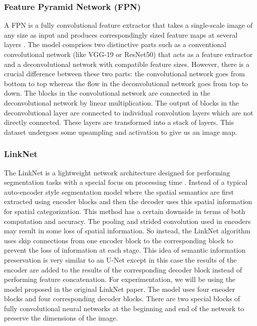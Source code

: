 \documentclass[a4paper,12pt]{spieman}  %
\begin{document}
\begin{spacing}{1}
\subsubsection{Feature Pyramid Network (FPN)}
A FPN is a fully convolutional feature extractor that takes a single-scale image of any size as input and produces correspondingly sized feature maps at several layers \cite{lin2017feature}. The model comprises two distinctive parts  such as  a conventional convolutional network (like VGG-19 or ResNet50) that acts as a feature extractor and a deconvolutional network with compatible feature sizes. However, there is a crucial difference between these two parts: the convolutional network goes from bottom to top whereas the flow in the deconvolutional network goes from top to down. The blocks in the convolutional network are connected in the deconvolutional network by linear multiplication. The output of blocks in the deconvolutional layer are connected to individual convolution layers which are not directly connected. These layers are transformed into a stack of layers. This dataset undergoes some upsampling and activation to give us an image map.
\subsubsection{LinkNet}
The LinkNet is a lightweight network architecture designed for performing segmentation tasks with a special focus on processing time \cite{chaurasia2017linknet}. Instead of a typical auto-encoder style segmentation model where the spatial semantics are first extracted using encoder blocks and then the decoder uses this spatial information for spatial categorization. This method has a certain downside in terms of both computation and accuracy. The pooling and strided convolution used in encoders may result in some loss of spatial information. So instead, the LinkNet algorithm uses skip connections from one encoder block to the corresponding block to prevent the loss of information at each stage. This idea of semantic information preservation is very similar to an U-Net except in this case the results of the encoder are added to the results of the corresponding decoder block instead of performing feature concatenation.
For experimentation, we will be using the model proposed in the original LinkNet paper. The model uses four encoder blocks and four corresponding decoder blocks. There are two special blocks of fully convolutional neural networks at the beginning and end of the network to preserve the dimensions of the image.

\end{spacing}
\end{document}
